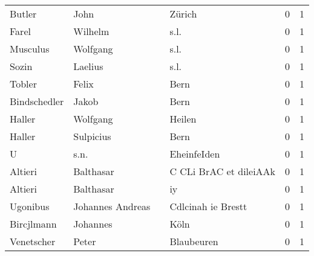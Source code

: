 \begin{tabular}{llllrr}
                   Butler &                               John &             &                                      Zürich &          0 &         1 \\
                    Farel &                            Wilhelm &             &                                        s.l. &          0 &         1 \\
                 Musculus &                           Wolfgang &             &                                        s.l. &          0 &         1 \\
                    Sozin &                            Laelius &             &                                        s.l. &          0 &         1 \\
                   Tobler &                              Felix &             &                                        Bern &          0 &         1 \\
             Bindschedler &                              Jakob &             &                                        Bern &          0 &         1 \\
                   Haller &                           Wolfgang &             &                                      Heilen &          0 &         1 \\
                   Haller &                          Sulpicius &             &                                        Bern &          0 &         1 \\
                        U &                               s.n. &             &                                 EheinfeIden &          0 &         1 \\
                  Altieri &                          Balthasar &             &                      C CLi BrAC et dileiAAk &          0 &         1 \\
                  Altieri &                          Balthasar &             &                                          iy &          0 &         1 \\
                 Ugonibus &                   Johannes Andreas &             &                          Cdlcinah ie Brestt &          0 &         1 \\
               Bircjlmann &                           Johannes &             &                                        Köln &          0 &         1 \\
               Venetscher &                              Peter &             &                                  Blaubeuren &          0 &         1 \\

\end{tabular}

